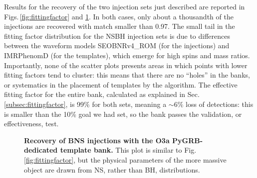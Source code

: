 \documentclass[binding=0.6cm, LaM]{sapthesis}
\begin{document}
        Results for the recovery of the two injection sets just described are reported in Figs.\,\ref{fig:fittingfactor} and \ref{fig:fittingfactorBNS}.  In both cases, only about a thousandth of the injections are recovered with match smaller than 0.97.  The small tail in the fitting factor distribution for the NSBH injection sets is due to differences between the waveform models {\ttfamily SEOBNRv4\_ROM} (for the injections) and {\ttfamily IMRPhenomD} (for the templates), which emerge for high spins and mass ratios.  Importantly, none of the scatter plots presents areas in which points with lower fitting factors tend to cluster:
        this means that there are no ``holes'' in the banks, or systematics in the placement of templates by the algorithm.
	The effective fitting factor for the entire bank, calculated as explained in Sec.\,\ref{subsec:fittingfactor}, is 99\% for both sets, meaning a $\sim 6\%$ loss of detections: this is smaller than the 10\% goal we had set, so the bank passes the validation, or effectiveness, test.

        \begin{figure}[!t]
          \noindent
          \centering
          \caption{{\bf Recovery of BNS injections with the O3a {\ttfamily PyGRB}-dedicated template bank.}  This plot is similar to Fig.\,\ref{fig:fittingfactor}, but the physical parameters of the more massive object are drawn from NS, rather than BH, distributions.}
          \label{fig:fittingfactorBNS}
        \end{figure}
\end{document}
